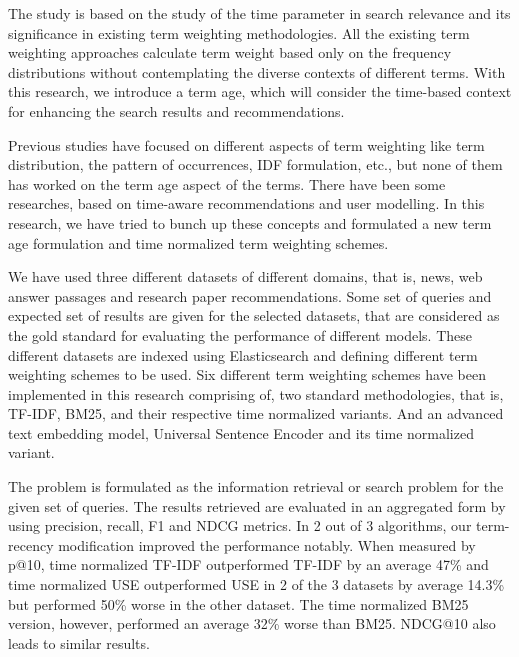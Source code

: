 \documentclass[a4paper, 12pt, oneside]{report}         %
\begin{document}
\begin{thesissummary}                           %
The study is based on the study of the time parameter in search relevance and its significance in existing term weighting methodologies. All the existing term weighting approaches calculate term weight based only on the frequency distributions without contemplating the diverse contexts of different terms. With this research, we introduce a term age, which will consider the time-based context for enhancing the search results and recommendations.

Previous studies have focused on different aspects of term weighting like term distribution, the pattern of occurrences, IDF formulation, etc., but none of them has worked on the term age aspect of the terms. There have been some researches, based on time-aware recommendations and user modelling. In this research, we have tried to bunch up these concepts and formulated a new term age formulation and time normalized term weighting schemes.

We have used three different datasets of different domains, that is, news, web answer passages and research paper recommendations. Some set of queries and expected set of results are given for the selected datasets, that are considered as the gold standard for evaluating the performance of different models. 
These different datasets are indexed using Elasticsearch and defining different term weighting schemes to be used. Six different term weighting schemes have been implemented in this research comprising of, two standard methodologies, that is, TF-IDF, BM25, and their respective time normalized variants. And an advanced text embedding model, Universal Sentence Encoder and its time normalized variant.

The problem is formulated as the information retrieval or search problem for the given set of queries. The results retrieved are evaluated in an aggregated form by using precision, recall, F1 and NDCG metrics. In 2 out of 3 algorithms, our term-recency modification improved the performance notably. When measured by p@10, time normalized TF-IDF outperformed TF-IDF by an average 47\% and time normalized USE outperformed USE in 2 of the 3 datasets by average 14.3\% but performed 50\% worse in the other dataset. The time normalized BM25 version, however, performed an average 32\% worse than BM25. NDCG@10 also leads to similar results.

\end{thesissummary}
\end{document}
